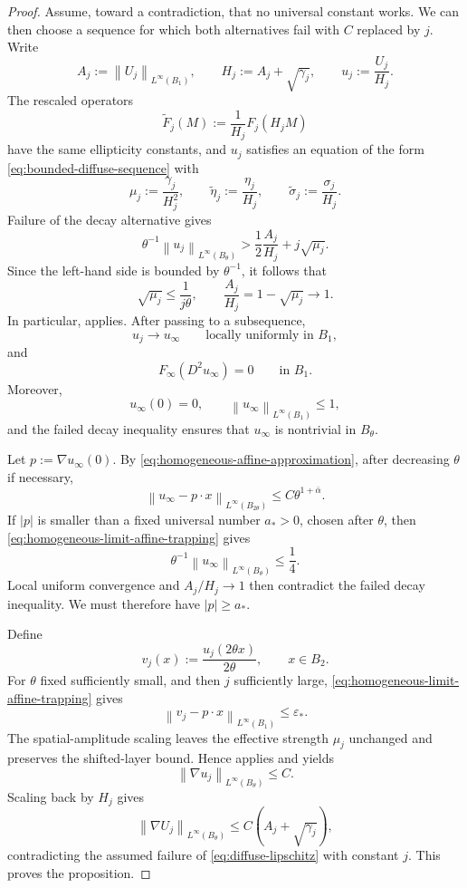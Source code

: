 \documentclass[11pt,letterpaper]{amsart}
\numberwithin{equation}{section}
\newcommand{\norm}[1]{\left\lVert #1\right\rVert}
\theoremstyle{definition}
\theoremstyle{remark}
\begin{document}
\begin{proof}
Assume, toward a contradiction, that no universal constant works. We can
then choose a sequence for which both alternatives fail with $C$ replaced
by $j$. Write
$$
A_j:=\norm{U_j}_{L^\infty(B_1)},
\qquad
H_j:=A_j+\sqrt{\gamma_j},
\qquad
u_j:=\frac{U_j}{H_j}.
$$
The rescaled operators
$$
\widetilde F_j(M)
:=
\frac1{H_j}F_j(H_jM)
$$
have the same ellipticity constants, and $u_j$ satisfies an equation of the
form \eqref{eq:bounded-diffuse-sequence} with
$$
\mu_j:=\frac{\gamma_j}{H_j^2},
\qquad
\widetilde\eta_j:=\frac{\eta_j}{H_j},
\qquad
\widetilde\sigma_j:=\frac{\sigma_j}{H_j}.
$$
Failure of the decay alternative gives
$$
\theta^{-1}\norm{u_j}_{L^\infty(B_\theta)}
>
\frac12\frac{A_j}{H_j}+j\sqrt{\mu_j}.
$$
Since the left-hand side is bounded by $\theta^{-1}$, it follows that
\begin{equation}\label{eq:normalized-strength-vanishes}
\sqrt{\mu_j}\leq\frac1{j\theta},
\qquad
\frac{A_j}{H_j}=1-\sqrt{\mu_j}\longrightarrow1.
\end{equation}
In particular,  applies. After
passing to a subsequence,
$$
u_j\longrightarrow u_\infty
\qquad\text{locally uniformly in }B_1,
$$
and
\begin{equation}\label{eq:normalized-homogeneous-limit}
F_\infty(D^2u_\infty)=0
\qquad\text{in }B_1.
\end{equation}
Moreover,
$$
u_\infty(0)=0,
\qquad
\norm{u_\infty}_{L^\infty(B_1)}\leq1,
$$
and the failed decay inequality ensures that $u_\infty$ is nontrivial in
$B_\theta$.

Let $p:=\nabla u_\infty(0)$. By
\eqref{eq:homogeneous-affine-approximation}, after decreasing $\theta$ if
necessary,
\begin{equation}\label{eq:homogeneous-limit-affine-trapping}
\norm{u_\infty-p\cdot x}_{L^\infty(B_{2\theta})}
\leq
C\theta^{1+\bar\alpha}.
\end{equation}
If $|p|$ is smaller than a fixed universal number $a_*>0$, chosen after
$\theta$, then \eqref{eq:homogeneous-limit-affine-trapping} gives
$$
\theta^{-1}\norm{u_\infty}_{L^\infty(B_\theta)}
\leq\frac14.
$$
Local uniform convergence and $A_j/H_j\to1$ then contradict the failed
decay inequality. We must therefore have $|p|\geq a_*$.

Define
$$
v_j(x)
:=
\frac{u_j(2\theta x)}{2\theta},
\qquad x\in B_2.
$$
For $\theta$ fixed sufficiently small, and then $j$ sufficiently large,
\eqref{eq:homogeneous-limit-affine-trapping} gives
$$
\norm{v_j-p\cdot x}_{L^\infty(B_1)}
\leq\varepsilon_*.
$$
The spatial-amplitude scaling leaves the effective strength $\mu_j$
unchanged and preserves the shifted-layer bound. Hence
 applies and yields
$$
\norm{\nabla u_j}_{L^\infty(B_\theta)}\leq C.
$$
Scaling back by $H_j$ gives
$$
\norm{\nabla U_j}_{L^\infty(B_\theta)}
\leq
C\left(A_j+\sqrt{\gamma_j}\right),
$$
contradicting the assumed failure of
\eqref{eq:diffuse-lipschitz} with constant $j$. This proves the
proposition.
\end{proof}
\end{document}
